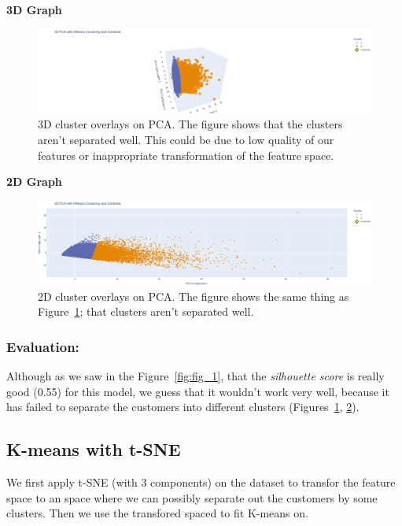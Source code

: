 \documentclass[a4paper,12pt]{article}
\begin{document}
\noindent\textbf{3D Graph}
\begin{figure}[H]
    \centering
    \includegraphics[width=1\textwidth]{./images/3d_pca_kmeans.png}
    \caption{3D cluster overlays on PCA. The figure shows that the clusters aren't separated well. This could be due to low quality of our features or inappropriate transformation of the feature space.}
    \label{fig:fig_2}
\end{figure}

\noindent\textbf{2D Graph}
\begin{figure}[H]
    \centering
    \includegraphics[width=1\textwidth]{./images/2d_pca_kmeans.png}
    \caption{2D cluster overlays on PCA. The figure shows the same thing as Figure~\ref{fig:fig_2}; that clusters aren't separated well.}
    \label{fig:fig_3}
\end{figure}

\subsubsection{Evaluation:}
Although as we saw in the Figure~\ref{fig:fig_1}, that the \textit{silhouette score} is really good (0.55) for this model, we guess that it wouldn't work very well, because it has failed to separate the customers into different clusters (Figures~\ref{fig:fig_2}, \ref{fig:fig_3}).


\subsection{K-means with t-SNE}
We first apply t-SNE (with 3 components) on the dataset to transfor the feature space to an space where we can possibly separate out the customers by some clusters. Then we use the transfored spaced to fit K-means on.  
\end{document}
